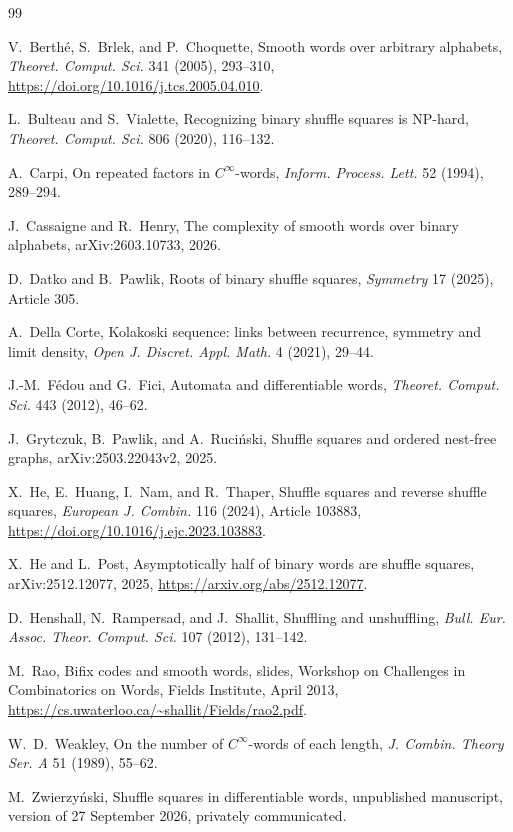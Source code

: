 \documentclass[11pt]{article}
\theoremstyle{definition}
\theoremstyle{remark}
\begin{document}
\begin{thebibliography}{99}

V.~Berth\'e, S.~Brlek, and P.~Choquette,
\newblock Smooth words over arbitrary alphabets,
\newblock \emph{Theoret. Comput. Sci.} 341 (2005), 293--310,
\newblock \url{https://doi.org/10.1016/j.tcs.2005.04.010}.


L.~Bulteau and S.~Vialette,
\newblock Recognizing binary shuffle squares is NP-hard,
\newblock \emph{Theoret. Comput. Sci.} 806 (2020), 116--132.

A.~Carpi,
\newblock On repeated factors in $C^\infty$-words,
\newblock \emph{Inform. Process. Lett.} 52 (1994), 289--294.

J.~Cassaigne and R.~Henry,
\newblock The complexity of smooth words over binary alphabets,
\newblock arXiv:2603.10733, 2026.

D.~Datko and B.~Pawlik,
\newblock Roots of binary shuffle squares,
\newblock \emph{Symmetry} 17 (2025), Article 305.

A.~Della Corte,
\newblock Kolakoski sequence: links between recurrence, symmetry and
limit density,
\newblock \emph{Open J. Discret. Appl. Math.} 4 (2021), 29--44.

J.-M.~Fédou and G.~Fici,
\newblock Automata and differentiable words,
\newblock \emph{Theoret. Comput. Sci.} 443 (2012), 46--62.

J.~Grytczuk, B.~Pawlik, and A.~Ruci\'{n}ski,
\newblock Shuffle squares and ordered nest-free graphs,
\newblock arXiv:2503.22043v2, 2025.

X.~He, E.~Huang, I.~Nam, and R.~Thaper,
\newblock Shuffle squares and reverse shuffle squares,
\newblock \emph{European J. Combin.} 116 (2024), Article 103883,
\newblock \url{https://doi.org/10.1016/j.ejc.2023.103883}.

X.~He and L.~Post,
\newblock Asymptotically half of binary words are shuffle squares,
\newblock arXiv:2512.12077, 2025,
\newblock \url{https://arxiv.org/abs/2512.12077}.

D.~Henshall, N.~Rampersad, and J.~Shallit,
\newblock Shuffling and unshuffling,
\newblock \emph{Bull. Eur. Assoc. Theor. Comput. Sci.} 107 (2012),
131--142.

M.~Rao,
\newblock Bifix codes and smooth words,
\newblock slides, Workshop on Challenges in Combinatorics on Words,
Fields Institute, April 2013,
\newblock \url{https://cs.uwaterloo.ca/~shallit/Fields/rao2.pdf}.

W.~D.~Weakley,
\newblock On the number of $C^\infty$-words of each length,
\newblock \emph{J. Combin. Theory Ser. A} 51 (1989), 55--62.

M.~Zwierzy\'nski,
\newblock Shuffle squares in differentiable words,
\newblock unpublished manuscript, version of 27 September 2026,
privately communicated.

\end{thebibliography}
\end{document}
